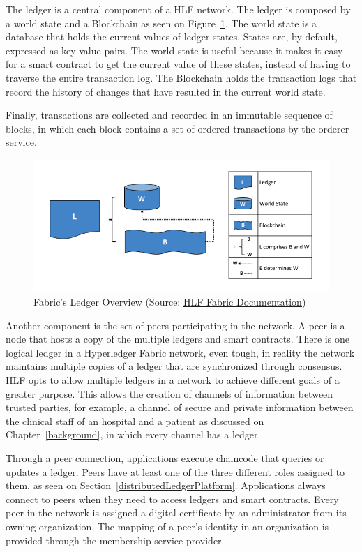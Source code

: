 The ledger is a central component of a HLF network. The ledger is composed by a
world state and a Blockchain as seen on Figure~\ref{fig:ledgerFabric}. The
world state is a database that holds the current values of ledger states.
States are, by default, expressed as key-value pairs. The world state is useful
because it makes it easy for a smart contract to get the current value of these
states, instead of having to traverse the entire transaction log. The
Blockchain holds the transaction logs that record the history of changes that
have resulted in the current world state.

Finally, transactions are collected and recorded in an immutable sequence of
blocks, in which each block contains a set of ordered transactions by the
orderer service.

\begin{figure}[ht] 
	\centering
	\includegraphics[width=1\linewidth]{imgs/ledgerFabric.png}
  \caption{\label{fig:ledgerFabric}Fabric's Ledger Overview (Source:
  \href{https://hyperledger-fabric.readthedocs.io/en/release-1.2/ledger/ledger.html}{HLF
  Fabric Documentation})}
\end{figure}

Another component is the set of peers participating in the network. A peer is a
node that hosts a copy of the multiple ledgers and smart contracts. There is
one logical ledger in a Hyperledger Fabric network, even tough, in reality the
network maintains multiple copies of a ledger that are synchronized through
consensus. HLF opts to allow multiple ledgers in a network to achieve different
goals of a greater purpose. This allows the creation of channels of information
between trusted parties, for example, a channel of secure and private
information between the clinical staff of an hospital and a patient as
discussed on Chapter~\ref{background}, in which every channel has a ledger.

Through a peer connection, applications execute chaincode that queries or
updates a ledger. Peers have at least one of the three different roles assigned
to them, as seen on Section~\ref{distributedLedgerPlatform}. Applications
always connect to peers when they need to access ledgers and smart contracts.
Every peer in the network is assigned a digital certificate by an administrator
from its owning organization. The mapping of a peer's identity in an
organization is provided through the membership service provider. 

